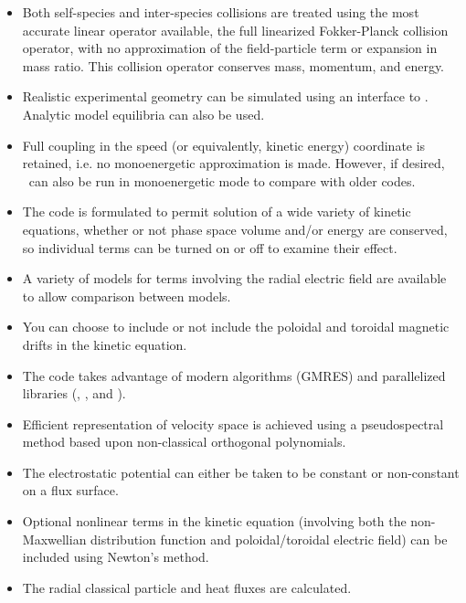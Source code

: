 \begin{itemize}

\item
Both self-species and inter-species collisions are treated using the most accurate linear operator available, the full linearized Fokker-Planck collision operator,
with no approximation of the field-particle term or expansion in mass ratio.  This collision operator conserves mass, momentum, and energy.

\item
Realistic experimental geometry can be simulated using an interface to \vmec.  Analytic model equilibria can also be used.

\item
Full coupling in the speed (or equivalently, kinetic energy) coordinate is retained, i.e. no monoenergetic approximation is made.  However,
if desired, \sfincs~can also be run in monoenergetic mode to compare with older codes.

\item
The code is formulated to permit solution of a wide variety of kinetic equations, whether or not phase space volume and/or energy are conserved, so individual terms can be turned on or off to examine their effect. 

\item
A variety of models for terms involving the radial electric field are available to allow comparison between models. 

\item
You can choose to include or not include the poloidal and toroidal magnetic drifts in the kinetic equation.

\item
The code takes advantage of modern algorithms (GMRES) and parallelized libraries (\PETSc, \superludist, and \mumps).

\item
Efficient representation of velocity space is achieved using a pseudospectral method based upon non-classical orthogonal polynomials. \cite{speedGrids}

\item
The electrostatic potential can either be taken to be constant or non-constant on a flux surface.

\item
Optional nonlinear terms in the kinetic equation (involving both the non-Maxwellian distribution function and poloidal/toroidal electric field) can be included using Newton's method. 

\item 
The radial classical particle and heat fluxes are calculated.

\end{itemize}

